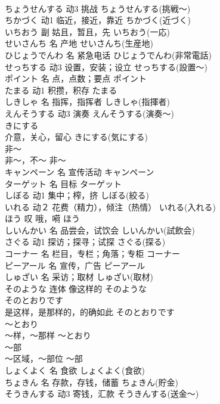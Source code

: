 \documentclass[8pt]{extreport}
\begin{document}
\begin{CJK}{UTF8}{min}
\\	ちょうせんする	动3	挑战	ちょうせんする(挑戦～)	
\\	ちかづく	动1	临近，接近，靠近	ちかづく(近づく)	
\\	いちおう	副	姑且，暂且，先	いちおう(一応)	
\\	せいさんち	名	产地	せいさんち(生産地)	
\\	ひじょうでんわ	名	紧急电话	ひじょうでんわ(非常電話)	
\\	せっちする	动3	设置，安装；设立	せっちする(設置～)	
\\	ポイント	名	点，点数；要点	ポイント	
\\	たまる	动1	积攒，积存	たまる	
\\	しきしゃ	名	指挥，指挥者	しきしゃ(指揮者)	
\\	えんそうする	动3	演奏	えんそうする(演奏～)	
\\	きにする	
\\	介意，关心，留心	きにする(気にする)	
\\	非～	
\\	非～，不～	非～	
\\	キャンペーン	名	宣传活动	キャンペーン	
\\	ターゲット	名	目标	ターゲット	
\\	しぼる	动1	集中；榨，挤	しぼる(絞る)	
\\	いれる	动２	花费（精力），倾注（热情）	いれる(入れる)	
\\	ほう	叹	哦，嗬	ほう	
\\	しいんかい	名	品尝会，试饮会	しいんかい(試飲会)	
\\	さぐる	动1	探访；探寻；试探	さぐる(探る)	
\\	コーナー	名	栏目，专栏；角落；专柜	コーナー	
\\	ピーアール	名	宣传，广告	ピーアール
\\	しゅざい	名	采访；取材	しゅざい(取材)	
\\	そのような	连体	像这样的	そのような	
\\	そのとおりです	
\\	是这样，是那样的，的确如此	そのとおりです	
\\	～とおり	
\\	～样，～那样	～とおり	
\\	～部	
\\	～区域，～部位	～部	
\\	しょくよく	名	食欲	しょくよく(食欲)	
\\	ちょきん	名	存款，存钱，储蓄	ちょきん(貯金)	
\\	そうきんする	动3	寄钱，汇款	そうきんする(送金～)	

\end{CJK}
\end{document}
